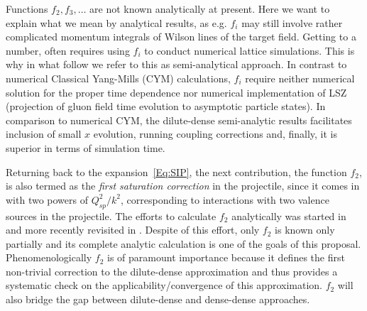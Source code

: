 Functions $f_2 , f_3 , \ldots$ are
not known analytically at present.
Here we want to explain what we mean by  analytical results, 
as e.g. $f_i$ may still involve rather  complicated momentum integrals 
of  Wilson lines of the target field. 
Getting to a number, often requires using $f_i$ to 
conduct numerical lattice simulations. This is why in what follow we 
refer to this as semi-analytical approach. 
In contrast to numerical Classical Yang-Mills (CYM)
calculations, $f_i$ require neither numerical solution 
for the proper time dependence nor numerical implementation of 
LSZ (projection of gluon field time evolution to asymptotic particle states). 
In comparison to numerical CYM, the dilute-dense semi-analytic 
results facilitates inclusion of small $x$ evolution, 
running coupling corrections and, finally, it is superior 
in terms of simulation time. 
 

Returning back to the expansion~\eqref{Eq:SIP},  
the next contribution, 
the function $f_2$, is  also termed as the {\it first saturation correction} in the
projectile, since it comes in with two powers of $Q_{sp}^2/k^2$,
corresponding to interactions with two valence sources in the projectile. 
The efforts to calculate $f_2$ analytically was started in
\myref\cite{Balitsky:2004rr} and more recently revisited in
\myref\cite{Chirilli:2015tea}. Despite of this effort, only $f_2$ is known only partially 
and its complete analytic calculation is one of the goals of this proposal. 
Phenomenologically $f_2$ is of paramount importance because it defines the first non-trivial 
correction to the dilute-dense approximation and thus provides a systematic
check on the applicability/convergence  of this approximation. 
$f_2$ will also bridge the gap between dilute-dense and dense-dense 
approaches. 


 
